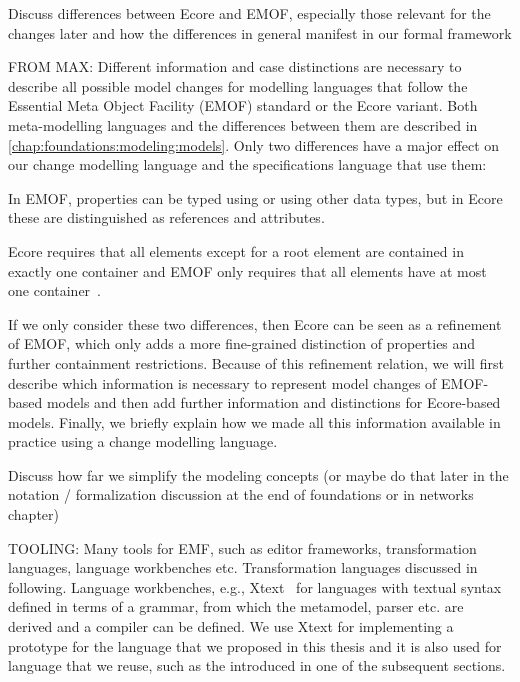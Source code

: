 Discuss differences between Ecore and EMOF, especially those relevant for the changes later and how the differences in general manifest in our formal framework

FROM MAX:
Different information and case distinctions are necessary to describe all possible model changes for modelling languages that follow the Essential Meta Object Facility (EMOF) standard or the Ecore variant. 
Both meta-modelling languages and the differences between them are described in \autoref{chap:foundations:modeling:models}.
Only two differences have a major effect on our change modelling language and the specifications language that use them:
\begin{longenumerate}%
\item In EMOF, properties can be typed using \metaclasses or using other data types, but in Ecore these are distinguished as references and attributes.
\item Ecore requires that all elements except for a root element are contained in exactly one container and EMOF only requires that all elements have at most one container~\cite[pp.\ 31-32]{mof}.
\end{longenumerate}
If we only consider these two differences, then Ecore can be seen as a refinement of EMOF, which only adds a more fine-grained distinction of properties and further containment restrictions.
Because of this refinement relation, we will first describe which information is necessary to represent model changes of EMOF-based models and then add further information and distinctions for Ecore-based models.
Finally, we briefly explain how we made all this information available in practice using a change modelling language.


\label{chap:foundations:formalisms:simplification}

Discuss how far we simplify the modeling concepts (or maybe do that later in the notation / formalization discussion at the end of foundations or in networks chapter)


TOOLING:
Many tools for EMF, such as editor frameworks, transformation languages, language workbenches etc.
Transformation languages discussed in following.
Language workbenches, e.g., Xtext~\cite{efftinge2006xtext-MSES,bettini2016Xtext-Book} for languages with textual syntax defined in terms of a grammar, from which the metamodel, parser etc. are derived and a compiler can be defined.
We use Xtext for implementing a prototype for the language that we proposed in this thesis and it is also used for language that we reuse, such as the \reactionslanguage introduced in one of the subsequent sections.


